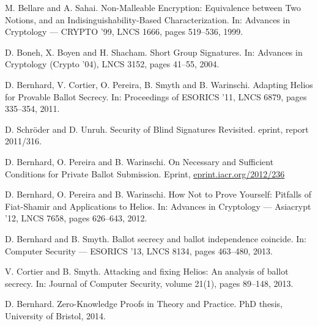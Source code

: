 \documentclass[envcountsame]{llncs}
\begin{document}
\begin{thebibliography}{XXX11}
M. Bellare and A. Sahai.
Non-Malleable Encryption: Equivalence between Two Notions, and an Indisinguishability-Based Characterization.
In: Advances in Cryptology --- CRYPTO '99, LNCS 1666, pages 519--536, 1999.

D. Boneh, X. Boyen and H. Shacham.
Short Group Signatures.
In: Advances in Cryptology (Crypto '04), LNCS 3152, pages 41--55, 2004.

D. Bernhard, V. Cortier, O. Pereira, B. Smyth and B. Warinschi.
Adapting Helios for Provable Ballot Secrecy.
In: Proceedings of ESORICS '11, LNCS 6879, pages 335--354, 2011.

D. Schr\"oder and D. Unruh.
Security of Blind Signatures Revisited.
eprint, report 2011/316.

D. Bernhard, O. Pereira and B. Warinschi.
On Necessary and Sufficient Conditions for Private Ballot Submission.
Eprint, \url{eprint.iacr.org/2012/236}

D. Bernhard, O. Pereira and B. Warinschi.
How Not to Prove Yourself: Pitfalls of Fiat-Shamir and Applications to Helios.
In: Advances in Cryptology --- Asiacrypt '12, LNCS 7658, pages 626--643, 2012.

D. Bernhard and B. Smyth.
Ballot secrecy and ballot independence coincide.
In: Computer Security --- ESORICS '13, LNCS 8134, pages 463--480, 2013.

V. Cortier and B. Smyth.
Attacking and fixing Helios: An analysis of ballot secrecy.
In: Journal of Computer Security, volume 21(1), pages 89--148, 2013.

D. Bernhard.
Zero-Knowledge Proofs in Theory and Practice.
PhD thesis, University of Bristol, 2014.

\end{thebibliography}
\end{document}
